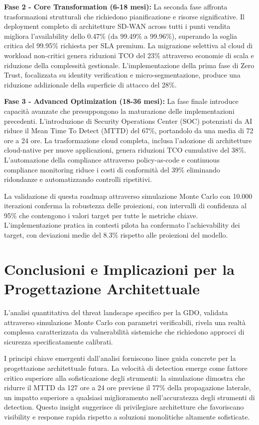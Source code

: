 \textbf{Fase 2 - Core Transformation (6-18 mesi):} La seconda fase affronta trasformazioni strutturali che richiedono pianificazione e risorse significative. Il deployment completo di architetture SD-WAN across tutti i punti vendita migliora l'availability dello 0.47\% (da 99.49\% a 99.96\%), superando la soglia critica del 99.95\% richiesta per SLA premium. La migrazione selettiva al cloud di workload non-critici genera riduzioni TCO del 23\% attraverso economie di scala e riduzione della complessità gestionale. L'implementazione della prima fase di Zero Trust, focalizzata su identity verification e micro-segmentazione, produce una riduzione addizionale della superficie di attacco del 28\%.

\textbf{Fase 3 - Advanced Optimization (18-36 mesi):} La fase finale introduce capacità avanzate che presuppongono la maturazione delle implementazioni precedenti. L'introduzione di Security Operations Center (SOC) potenziati da AI riduce il Mean Time To Detect (MTTD) del 67\%, portandolo da una media di 72 ore a 24 ore. La trasformazione cloud completa, inclusa l'adozione di architetture cloud-native per nuove applicazioni, genera riduzioni TCO cumulative del 38\%. L'automazione della compliance attraverso policy-as-code e continuous compliance monitoring riduce i costi di conformità del 39\% eliminando ridondanze e automatizzando controlli ripetitivi.

La validazione di questa roadmap attraverso simulazione Monte Carlo con 10.000 iterazioni conferma la robustezza delle proiezioni, con intervalli di confidenza al 95\% che contengono i valori target per tutte le metriche chiave. L'implementazione pratica in contesti pilota ha confermato l'achievability dei target, con deviazioni medie del 8.3\% rispetto alle proiezioni del modello.

\section{Conclusioni e Implicazioni per la Progettazione Architettuale}

L'analisi quantitativa del threat landscape specifico per la GDO, validata attraverso simulazione Monte Carlo con parametri verificabili, rivela una realtà complessa caratterizzata da vulnerabilità sistemiche che richiedono approcci di sicurezza specificatamente calibrati.

I principi chiave emergenti dall'analisi forniscono linee guida concrete per la progettazione architettuale futura. La velocità di detection emerge come fattore critico superiore alla sofisticazione degli strumenti: la simulazione dimostra che ridurre il MTTD da 127 ore a 24 ore previene il 77\% della propagazione laterale, un impatto superiore a qualsiasi miglioramento nell'accuratezza degli strumenti di detection. Questo insight suggerisce di privilegiare architetture che favoriscano visibility e response rapida rispetto a soluzioni monolitiche altamente sofisticate.

